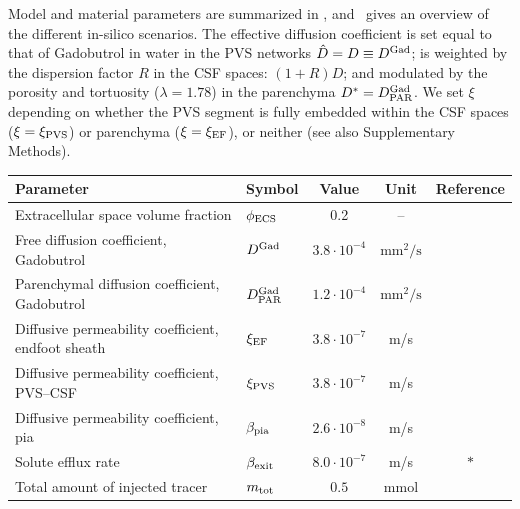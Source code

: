 \documentclass[fleqn,10pt]{wlscirep}
\begin{document}
Model and material parameters are summarized in ,
and~ gives an overview of the different in-silico
scenarios.
%
%
The effective diffusion coefficient is set equal to that of Gadobutrol
in water in the PVS networks $\hat{D} = D \equiv D^{\rm Gad}$; is 
weighted by the dispersion factor $R$ in the CSF spaces: $(1 + R) D$;
and modulated by the porosity and tortuosity ($\lambda = 1.78$) in the
parenchyma $D^{\ast} = D^{\rm Gad}_{\rm PAR}$. We set $\xi$ depending
on whether the PVS segment is fully embedded within the CSF spaces
($\xi = \xi_{\rm PVS}$) or parenchyma ($\xi = \xi_{\rm EF}$), or
neither (see also Supplementary Methods). 
\begin{table}
  \begin{center}
    \begin{tabular}{ll|ccc}
      \toprule
      Parameter& Symbol & Value & Unit& Reference\\
      \midrule
      Extracellular space volume fraction & $\phi_{\rm ECS}$ & 0.2 & -- & \cite{nicholson1981ion} \\
      Free diffusion coefficient, Gadobutrol & $D^{\rm Gad}$ & $3.8 \cdot 10^{-4}$& $\text{mm}^2/\text{s}$ & \cite{valnes2020apparent}\\
      Parenchymal diffusion coefficient, Gadobutrol & $D^{\rm Gad}_{\rm PAR}$ & $1.2 \cdot 10^{-4}$ & $\text{mm}^2/\text{s}$  & \cite{hornkjol2022csf} \\
      Diffusive permeability coefficient, endfoot sheath & $\xi_{\rm EF}$ & $3.8\cdot 10^{-7}$  & m/s & \cite{koch2023estimates} \\
      Diffusive permeability coefficient, PVS--CSF & $\xi_{\rm PVS}$ & $3.8\cdot 10^{-7}$  & m/s & \cite{koch2023estimates} \\
      Diffusive permeability coefficient, pia & $\beta_{\rm pia}$ & $2.6 \cdot 10^{-8}$ & m/s & \cite{riseth2025twocompartment} \\
      Solute efflux rate & $\beta_{\rm exit}$ & $8.0 \cdot 10^{-7}$ & m/s & $\ast$ \\
      Total amount of injected tracer & $m_{\rm tot}$ & $0.5$ & mmol & \cite{eide2024functional} \\

\end{tabular}
\end{center}
\end{table}
\end{document}
